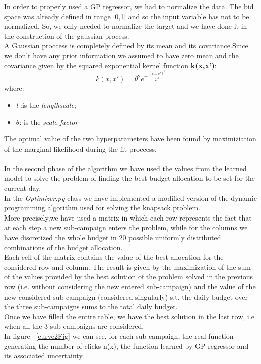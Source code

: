 In order to properly used a GP regressor, we had to normalize the data. The bid space was already defined in range [0,1] and so the input variable has not to be normalized. So, we only needed to normalize the target and we have done it in the construction of the gaussian process.\\
A Gaussian proccess is completely defined by its mean and its covariance.Since we don't have any prior information we assumed to have zero mean and the covariance given by the squared exponential kernel function \textbf{k(x,x')}:
\begin{equation}
	k(x,x') = \theta^{2} e^{-\frac{(x-x')^2}{2 l^2}}
\end{equation}
where:
\begin{itemize}
	\item \textit{l} :is the \textit{lengthscale};
	\item $\theta$: is the \textit{scale factor}
\end{itemize}
The optimal value of the two hyperparameters have been found by maximiziation of the marginal likelihood during the fit proccess.
\\
\\
In the second phase of the algorithm we have used the values from the learned model to solve the problem of finding the best budget allocation to be set for the current day.\\
In the \textit{Optimizer.py} class we have implemented a modified version of the dynamic programming algorithm used for solving the knapsack problem.\\
More precisely,we have used a matrix in which each row represents the fact that at each step a new sub-campaign enters the problem, while for the columns we have discretized the whole budget in 20 possible uniformly distributed combinations of the budget allocation.\\
Each cell of the matrix contains the value of the best allocation for the considered row and column. 
The result is given by the maximization of the sum of the values provided by the best solution of the problem solved in the previous row (i.e. without considering the new entered sub-campaign) and 
the value of the new considered sub-campaign (considered singularly) s.t. the daily budget over the three sub-campaigns sums to the total daily budget.\\
Once we have filled the entire table, we have the best solution in the last row, i.e. when all the 3 sub-campaigns are considered.\\
In figure ~\ref{curve2Fig} we can see, for each sub-campaign, the real function generating the number of clicks n(x), the function learned by GP regressor and its associated uncertainty.


